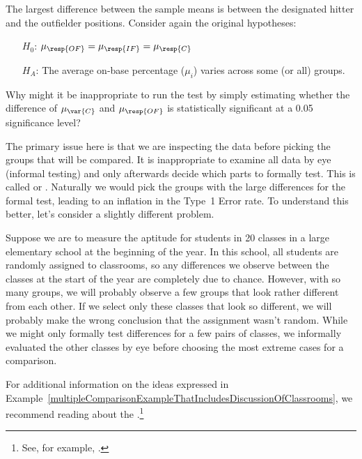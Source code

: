 \begin{examplewrap}
\begin{nexample}{The largest difference between the sample means is between the designated hitter and the outfielder positions. Consider again the original hypotheses:
\begin{itemize}
\setlength{\itemsep}{0mm}
\item[$H_0$:] $\mu_{\resp{OF}} = \mu_{\resp{IF}} =
    \mu_{\resp{C}}$
\item[$H_A$:] The average on-base percentage ($\mu_i$) varies across some (or all) groups.
\end{itemize}
Why might it be inappropriate to run the test by simply estimating whether the difference of $\mu_{\var{C}}$ and $\mu_{\resp{OF}}$ is statistically significant at a 0.05 significance level?}
\label{multipleComparisonExampleThatIncludesDiscussionOfClassrooms}
The primary issue here is that we are inspecting the data before picking the groups that will be compared. It is inappropriate to examine all data by eye (informal testing) and only afterwards decide which parts to formally test. This is called  or . Naturally we would pick the groups with the large differences for the formal test, leading to an inflation in the Type~1 Error rate. To understand this better, let's consider a slightly different problem.

Suppose we are to measure the aptitude for students in 20 classes in a large elementary school at the beginning of the year. In this school, all students are randomly assigned to classrooms, so any differences we observe between the classes at the start of the year are completely due to chance. However, with so many groups, we will probably observe a few groups that look rather different from each other. If we select only these classes that look so different, we will probably make the wrong conclusion that the assignment wasn't random. While we might only formally test differences for a few pairs of classes, we informally evaluated the other classes by eye before choosing the most extreme cases for a comparison.
\end{nexample}
\end{examplewrap}

For additional information on the ideas expressed in Example~\ref{multipleComparisonExampleThatIncludesDiscussionOfClassrooms}, we recommend reading about the .\footnote{See, for example, .}

